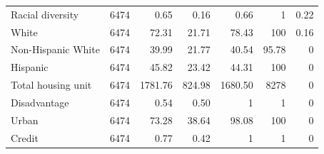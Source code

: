 \documentclass[11pt,twoside,letterpaper]{article}
\begin{document}
\begin{table}[H]
{\begin{tabular}{lrrrrrr}
Racial diversity & 6474 & 0.65 & 0.16 & 0.66 & 1 & 0.22 \\
White & 6474 & 72.31 & 21.71 & 78.43 & 100 & 0.16 \\
Non-Hispanic White & 6474 & 39.99 & 21.77 & 40.54 & 95.78 & 0 \\
Hispanic & 6474 & 45.82 & 23.42 & 44.31 & 100 & 0 \\
Total housing unit & 6474 & 1781.76 & 824.98 & 1680.50 & 8278 & 0 \\
Disadvantage & 6474 & 0.54 & 0.50 & 1 & 1 & 0 \\
Urban & 6474 & 73.28 & 38.64 & 98.08 & 100 & 0 \\
Credit & 6474 & 0.77 & 0.42 & 1 & 1 & 0 \\ \hline
\end{tabular}%
}
\end{table}
\end{document}
